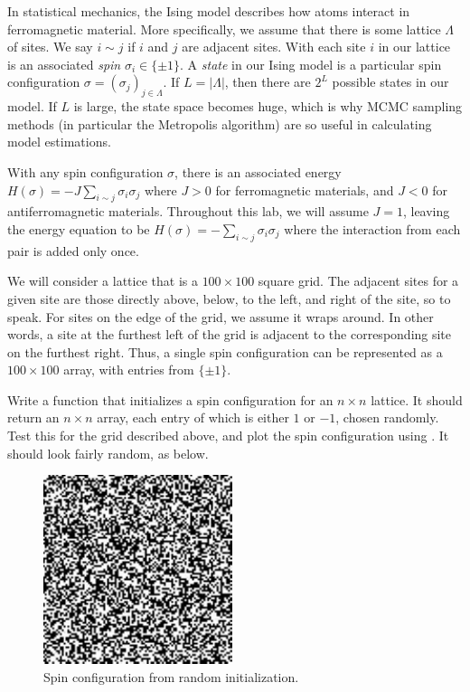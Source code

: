 In statistical mechanics, the Ising model describes how atoms interact in ferromagnetic material. More specifically, we assume that there is some lattice $\Lambda$ of sites. We say $i \sim j$ if $i$ and $j$ are adjacent sites. With each site $i$ in our lattice is an associated \emph{spin} $\sigma_{i} \in \{\pm 1\}$. A \emph{state} in our Ising model is a particular spin configuration $\sigma = (\sigma_{j})_{j \in \Lambda}$. If $L = |\Lambda|$, then there are $2^{L}$ possible states in our model. If $L$ is large, the state space becomes huge, which is why MCMC sampling methods (in particular the Metropolis algorithm) are so useful in calculating model estimations.

With any spin configuration $\sigma$, there is an associated energy $H(\sigma) = -J \sum_{i \sim j} \sigma_{i} \sigma_{j}$ where $J > 0$ for ferromagnetic materials, and $J < 0$ for antiferromagnetic materials. Throughout this lab, we will assume $J = 1$, leaving the energy equation to be $H(\sigma) = -\sum_{i \sim j} \sigma_{i}\sigma_{j}$ where the interaction from each pair is added only once.

We will consider a lattice that is a $100 \times 100$ square grid. The adjacent sites for a given site are those directly above, below, to the left, and right of the site, so to speak. For sites on the edge of the grid, we assume it wraps around. In other words, a site at the furthest left of the grid is adjacent to the corresponding site on the furthest right. Thus, a single spin configuration can be represented as a $100 \times 100$ array, with entries from $\{\pm 1\}$.

\begin{problem}
Write a function that initializes a spin configuration for an $n \times n$ lattice. It should return an $n \times n$ array, each entry of which is either $1$ or $-1$, chosen randomly. Test this for the grid described above, and plot the spin configuration using . It should look fairly random, as below.
\end{problem}

\begin{figure}
\centering
\includegraphics[width=.5\textwidth]{init.pdf}
\caption{Spin configuration from random initialization.}
\end{figure}

